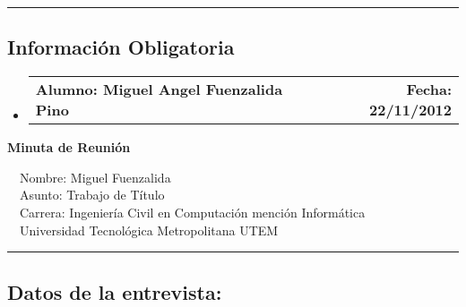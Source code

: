 \documentclass[10pt,letterpaper]{article}
\makeatletter
\newcommand{\headerrow}[2]
{\begin{tabular*}{\linewidth}{l@{\extracolsep{\fill}}r}
	#1 &
	#2 \\
\end{tabular*}}
\makeatother
\begin{document}
\hrule
\vspace{-0.4em}
\subsection*{Información Obligatoria}

\begin{itemize}
	\parskip=0.1em

	\item 
	\headerrow
		{\textbf{Alumno: Miguel Angel Fuenzalida Pino}}
		{\textbf{Fecha: 22/11/2012}}

\end{itemize}
\newpage
\begin{center}
{\LARGE \textbf{Minuta de Reunión}}

\ \ \textbullet Nombre: Miguel Fuenzalida
\\
\ \ \textbullet Asunto: Trabajo de Título
\\
\ \ \textbullet Carrera: Ingeniería Civil en Computación mención Informática
\\
\ \ \textbullet Universidad Tecnológica Metropolitana UTEM
\end{center}

\hrule
\vspace{-0.4em}
\subsection*{Datos de la entrevista:}
\end{document}
